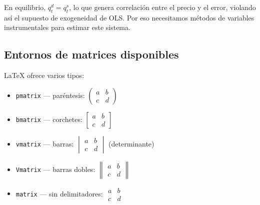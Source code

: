 \documentclass[12pt, a4paper]{article}
\begin{document}
En equilibrio, $q_t^d = q_t^s$, lo que genera correlación entre el precio 
y el error, violando así el supuesto de exogeneidad de OLS. Por eso necesitamos 
métodos de variables instrumentales para estimar este sistema.

\subsection*{Entornos de matrices disponibles}

\LaTeX{} ofrece varios tipos:
\begin{itemize}
  \item \texttt{pmatrix} — paréntesis: $\begin{pmatrix} a & b \\ c & d \end{pmatrix}$
  \item \texttt{bmatrix} — corchetes: $\begin{bmatrix} a & b \\ c & d \end{bmatrix}$
  \item \texttt{vmatrix} — barras: $\begin{vmatrix} a & b \\ c & d \end{vmatrix}$ (determinante)
  \item \texttt{Vmatrix} — barras dobles: $\begin{Vmatrix} a & b \\ c & d \end{Vmatrix}$
  \item \texttt{matrix} — sin delimitadores: $\begin{matrix} a & b \\ c & d \end{matrix}$
\end{itemize}
\end{document}
